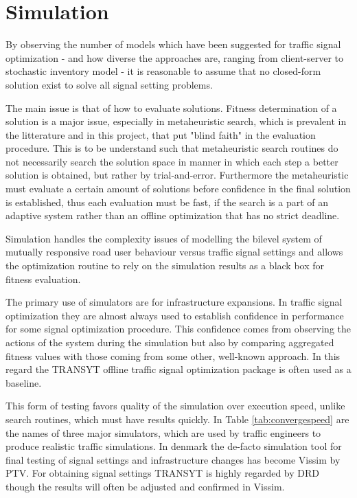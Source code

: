 \section{Simulation}
\label{simulation}
By observing the number of models which have been suggested for traffic signal optimization - and how diverse the approaches are, ranging from client-server to stochastic inventory model - it is reasonable to assume that no closed-form solution exist to solve all signal setting problems. 

The main issue is that of how to evaluate solutions. Fitness determination of a solution is a major issue, especially in metaheuristic search, which is prevalent in the litterature and in this project, that put "blind faith" in the evaluation procedure. This is to be understand such that metaheuristic search routines do not necessarily search the solution space in manner in which each step a better solution is obtained, but rather by trial-and-error. 
Furthermore the metaheuristic must evaluate a certain amount of solutions before confidence in the final solution is established, thus each evaluation must be fast, if the search is a part of an adaptive system rather than an offline optimization that has no strict deadline.

Simulation handles the complexity issues of modelling the bilevel system of mutually responsive road user behaviour versus traffic signal settings and allows the optimization routine to rely on the simulation results as a black box for fitness evaluation. 

The primary use of simulators are for infrastructure expansions. In traffic signal optimization they are almost always used to establish confidence in performance for some signal optimization procedure. This confidence comes from observing the actions of the system during the simulation but also by comparing aggregated fitness values with those coming from some other, well-known approach. In this regard the TRANSYT offline traffic signal optimization package is often used as a baseline. 

This form of testing favors quality of the simulation over execution speed, unlike search routines, which must have results quickly. 
In Table \ref{tab:convergespeed} are the names of three major simulators, which are used by traffic engineers to produce realistic traffic simulations. 
In denmark the de-facto simulation tool for final testing of signal settings and infrastructure changes has become Vissim by PTV. For obtaining signal settings TRANSYT is highly regarded by DRD though the results will often be adjusted and confirmed in Vissim.

